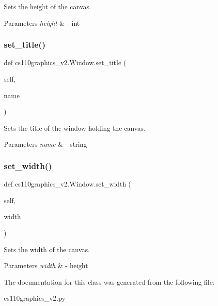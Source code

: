 Sets the height of the canvas. 


\begin{DoxyParams}{Parameters}
{\em height} & -\/ int \\
\hline
\end{DoxyParams}
\mbox{\label{classcs110graphics__v2_1_1Window_a51c356f41a601bb5262901464ee8e564}} 
\subsubsection{\texorpdfstring{set\_title()}{set\_title()}}
{\footnotesize\ttfamily def cs110graphics\+\_\+v2.\+Window.\+set\+\_\+title (\begin{DoxyParamCaption}\item[{}]{self,  }\item[{}]{name }\end{DoxyParamCaption})}



Sets the title of the window holding the canvas. 


\begin{DoxyParams}{Parameters}
{\em name} & -\/ string \\
\hline
\end{DoxyParams}
\mbox{\label{classcs110graphics__v2_1_1Window_a4cc380067fac12547e4e954e4f2a7aa7}} 
\subsubsection{\texorpdfstring{set\_width()}{set\_width()}}
{\footnotesize\ttfamily def cs110graphics\+\_\+v2.\+Window.\+set\+\_\+width (\begin{DoxyParamCaption}\item[{}]{self,  }\item[{}]{width }\end{DoxyParamCaption})}



Sets the width of the canvas. 


\begin{DoxyParams}{Parameters}
{\em width} & -\/ height \\
\hline
\end{DoxyParams}


The documentation for this class was generated from the following file\+:\begin{DoxyCompactItemize}
\item 
cs110graphics\+\_\+v2.\+py\end{DoxyCompactItemize}
